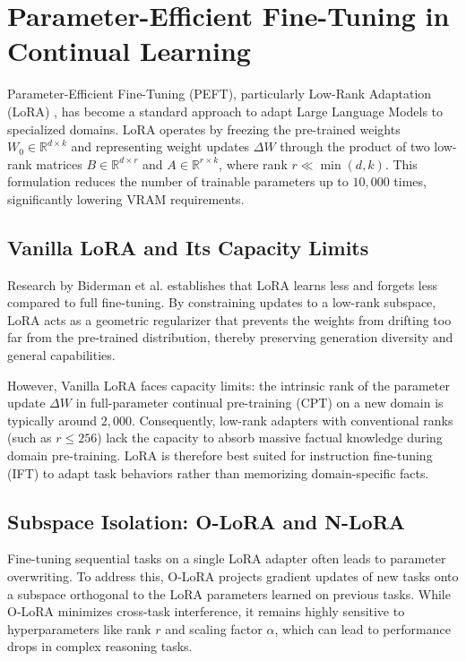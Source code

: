 \section{Parameter-Efficient Fine-Tuning in Continual Learning}

Parameter-Efficient Fine-Tuning (PEFT), particularly Low-Rank Adaptation (LoRA) \parencite{hu2021loralowrankadaptationlarge}, has become a standard approach to adapt Large Language Models to specialized domains. LoRA operates by freezing the pre-trained weights $W_0 \in \mathbb{R}^{d \times k}$ and representing weight updates $\Delta W$ through the product of two low-rank matrices $B \in \mathbb{R}^{d \times r}$ and $A \in \mathbb{R}^{r \times k}$, where rank $r \ll \min(d, k)$. This formulation reduces the number of trainable parameters up to $10,000$ times, significantly lowering VRAM requirements.

\subsection{Vanilla LoRA and Its Capacity Limits}
Research by Biderman et al. \parencite{biderman2024loralearnsforgets} establishes that LoRA learns less and forgets less compared to full fine-tuning. By constraining updates to a low-rank subspace, LoRA acts as a geometric regularizer that prevents the weights from drifting too far from the pre-trained distribution, thereby preserving generation diversity and general capabilities.

However, Vanilla LoRA faces capacity limits: the intrinsic rank of the parameter update $\Delta W$ in full-parameter continual pre-training (CPT) on a new domain is typically around $2,000$. Consequently, low-rank adapters with conventional ranks (such as $r \le 256$) lack the capacity to absorb massive factual knowledge during domain pre-training. LoRA is therefore best suited for instruction fine-tuning (IFT) to adapt task behaviors rather than memorizing domain-specific facts.

\subsection{Subspace Isolation: O-LoRA and N-LoRA}
Fine-tuning sequential tasks on a single LoRA adapter often leads to parameter overwriting. To address this, O-LoRA \parencite{wang-etal-2023-orthogonal, repec:axf:aidtaa:v:3:y:2026:i:1:p:52-61} projects gradient updates of new tasks onto a subspace orthogonal to the LoRA parameters learned on previous tasks. While O-LoRA minimizes cross-task interference, it remains highly sensitive to hyperparameters like rank $r$ and scaling factor $\alpha$, which can lead to performance drops in complex reasoning tasks.

